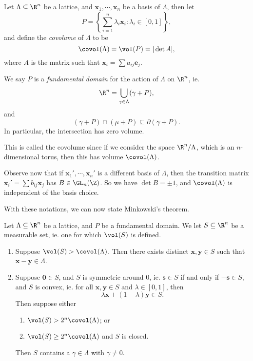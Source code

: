 \documentclass[a4paper]{article}
\begin{document}
\begin{defi}
  Let $\Lambda \subseteq \R^n$ be a lattice, and $\mathbf{x}_1, \cdots, \mathbf{x}_n$ be a basis of $\Lambda$, then let
  \[
    P = \left\{\sum_{i = 1}^n \lambda_i \mathbf{x}_i: \lambda_i \in [0, 1]\right\},
  \]
  and define the \emph{covolume} of $\Lambda$ to be
  \[
    \covol(\Lambda) = \vol(P) = |\det A|,
  \]
  where $A$ is the matrix such that $\mathbf{x}_i = \sum a_{ij} \mathbf{e}_j$.

  We say $P$ is a \emph{fundamental domain} for the action of $\Lambda$ on $\R^n$, ie.
  \[
    \R^n = \bigcup_{\gamma \in \Lambda} (\gamma + P),
  \]
  and
  \[
    (\gamma + P) \cap (\mu + P) \subseteq \partial (\gamma + P).
  \]
  In particular, the intersection has zero volume.
\end{defi}
This is called the covolume since if we consider the space $\R^n/ \Lambda$, which is an $n$-dimensional torus, then this has volume $\covol (\Lambda)$.

Observe now that if $\mathbf{x}_1', \cdots, \mathbf{x}_n'$ is a different basis of $\Lambda$, then the transition matrix $\mathbf{x}_i' = \sum b_{ij} \mathbf{x}_j$ has $B \in \GL_n (\Z)$. So we have $\det B = \pm 1$, and $\covol (\Lambda)$ is independent of the basis choice.

With these notations, we can now state Minkowski's theorem.

\begin{thm}
  Let $\Lambda \subseteq \R^n$ be a lattice, and $P$ be a fundamental domain. We let $S \subseteq \R^n$ be a measurable set, ie. one for which $\vol(S)$ is defined.
  \begin{enumerate}
    \item Suppose $\vol(S) > \covol(\Lambda)$. Then there exists distinct $\mathbf{x}, \mathbf{y} \in S$ such that $\mathbf{x} - \mathbf{y} \in \Lambda$.
    \item Suppose $\mathbf{0} \in S$, and $S$ is symmetric around $0$, ie. $\mathbf{s} \in S$ if and only if $-\mathbf{s} \in S$, and $S$ is convex, ie. for all $\mathbf{x}, \mathbf{y} \in S$ and $\lambda \in [0, 1]$, then
      \[
        \lambda \mathbf{x} + (1 - \lambda)\mathbf{y} \in S.
      \]
      Then suppose either
      \begin{enumerate}
        \item $\vol (S) > 2^n \covol(\Lambda)$; or
        \item $\vol (S) \geq 2^n \covol(\Lambda)$ and $S$ is closed.
      \end{enumerate}
      Then $S$ contains a $\gamma \in \Lambda$ with $\gamma \not= 0$.
  \end{enumerate}
\end{thm}
\end{document}
